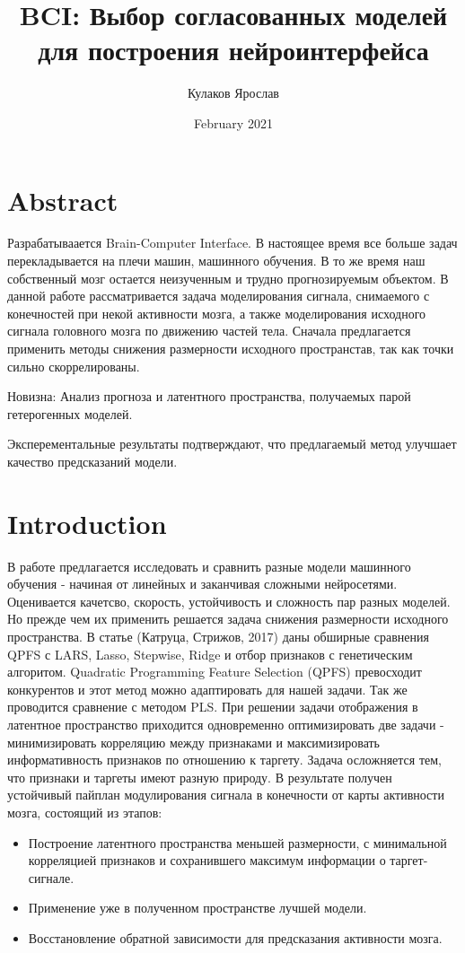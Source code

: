 \documentclass{article}
\title{BCI: Выбор согласованных моделей для построения нейроинтерфейса}
\author{Кулаков Ярослав}
\date{February 2021}
\begin{document}
\maketitle

\section{Abstract}
Разрабатываается Brain-Computer Interface. В настоящее время все больше задач перекладывается на плечи машин, машинного обучения. В то же время наш собственный мозг остается неизученным и трудно прогнозируемым объектом. В данной работе рассматривается задача моделирования сигнала, снимаемого с конечностей при некой активности мозга, а также моделирования исходного сигнала головного мозга по движению частей тела. Сначала предлагается применить методы снижения размерности исходного пространстав, так как точки сильно скоррелированы.

Новизна: Анализ прогноза и латентного пространства, получаемых парой гетерогенных моделей.

Эксперементальные результаты подтверждают, что предлагаемый метод улучшает качество предсказаний модели.

\section{Introduction}
В работе предлагается исследовать и сравнить разные модели машинного обучения - начиная от линейных и заканчивая сложными нейросетями. Оценивается качетсво, скорость, устойчивость и сложность пар разных моделей. Но прежде чем их применить решается задача снижения размерности исходного пространства. В статье (Катруца, Стрижов, 2017) даны обширные сравнения QPFS с LARS, Lasso, Stepwise, Ridge и отбор признаков с генетическим алгоритом. Quadratic Programming Feature Selection (QPFS) превосходит конкурентов и этот метод можно адаптировать для нашей задачи. Так же проводится сравнение с методом PLS.  При решении задачи отображения в латентное пространство приходится одновременно оптимизировать две задачи - минимизировать корреляцию между признаками и максимизировать информативность 
признаков по отношению к таргету. Задача осложняется тем, что признаки и таргеты имеют разную природу. 
В результате получен устойчивый пайплан модулирования сигнала в конечности от карты активности мозга, состоящий из этапов:
\begin{itemize}
    \item Построение латентного пространства меньшей размерности, с минимальной корреляцией признаков и сохранившего максимум информации о таргет-сигнале.
    \item Применение уже в полученном пространстве лучшей модели.
     \item Восстановление обратной зависимости для предсказания активности мозга.
\end{itemize}
\end{document}
